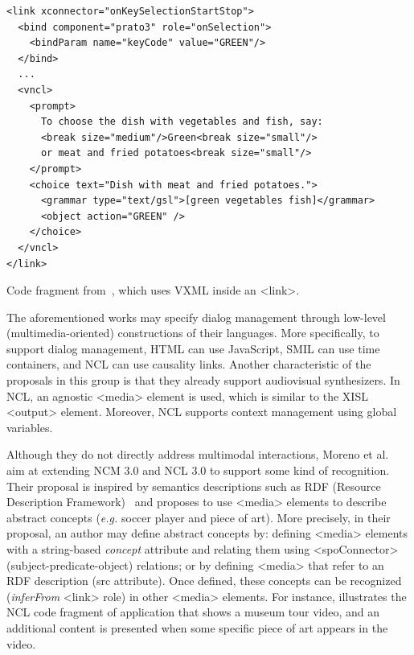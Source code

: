 \begin{listing}[!ht]
\begin{verbatim}
<link xconnector="onKeySelectionStartStop">
  <bind component="prato3" role="onSelection">
    <bindParam name="keyCode" value="GREEN"/>
  </bind>
  ...
  <vncl>
    <prompt>
      To choose the dish with vegetables and fish, say:
      <break size="medium"/>Green<break size="small"/>
      or meat and fried potatoes<break size="small"/>
    </prompt>
    <choice text="Dish with meat and fried potatoes.">
      <grammar type="text/gsl">[green vegetables fish]</grammar>
      <object action="GREEN" />
    </choice>
  </vncl>
</link>
\end{verbatim}
\caption[NCL using VXML inside an <link>.]{Code fragment
from~\cite{carvalho_estendendo_2010}, which uses VXML inside an <link>.}
\label{list:carvalho2}
\end{listing}

The aforementioned works may specify dialog management through low-level
(multimedia-oriented) constructions of their languages. More specifically, to
support dialog management, HTML can use JavaScript, SMIL can use time
containers, and NCL can use causality links. Another characteristic of the
proposals in this group is that they already support audiovisual synthesizers.
In NCL, an agnostic <media> element is used, which is similar to the XISL
<output> element. Moreover, NCL supports context management using global
variables.

Although they do not directly address multimodal interactions, Moreno et
al.~\cite{moreno_extending_2017} aim at extending NCM 3.0 and NCL 3.0 to
support some kind of recognition.
Their proposal is inspired by semantics descriptions such as RDF (Resource Description Framework)~\cite{w3c_rdf/xml_2014} and proposes to
use <media> elements to describe abstract concepts (\textit{e.g.} soccer player and piece
of art). More precisely, in their proposal, an author may define abstract
concepts by: defining <media> elements with a string-based \textit{concept}
attribute and relating them using <spoConnector> (subject-predicate-object)
relations; or by defining <media> that refer to an RDF description (src
attribute). Once defined, these concepts can be recognized (\textit{inferFrom}
<link> role) in other <media> elements. For instance, 
illustrates the NCL code fragment of application that shows a museum tour
video, and an additional content is presented when some specific piece of art
appears in the video.

